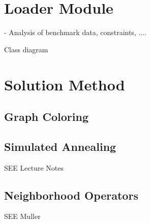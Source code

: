 \section{Loader Module}

- Analysis of benchmark data, constraints, ....

Class diagram


\section{Solution Method}

\subsection{Graph Coloring}

\subsection{Simulated Annealing}

SEE Lecture Notes

\subsection{Neighborhood Operators}

SEE Muller









